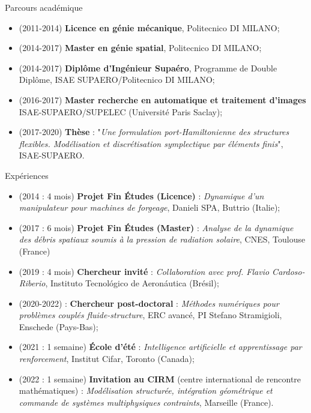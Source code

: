 \documentclass[aspectratio=169, french]{beamer}
\begin{document}
\begin{frame}{Parcours académique}
\begin{itemize}
	\item (2011-2014) \textbf{Licence en génie mécanique}, Politecnico DI MILANO;
	\item (2014-2017) \textbf{Master en génie spatial}, Politecnico DI MILANO;
	\item (2014-2017) \textbf{Diplôme d’Ingénieur Supaéro}, Programme de
	Double Diplôme, ISAE SUPAERO/Politecnico DI MILANO;
	\item (2016-2017) \textbf{Master recherche en automatique et traitement d’images
	} ISAE-SUPAERO/SUPELEC (Université Paris Saclay);
	\item (2017-2020) \textbf{Thèse} : "\textit{Une formulation port-Hamiltonienne des structures flexibles. Modélisation et discrétisation symplectique par éléments finis}", ISAE-SUPAERO.
\end{itemize}
\end{frame}

\begin{frame}{Expériences}
\begin{itemize}
\item (2014 : 4 mois) \textbf{Projet Fin Études (Licence)} : \textit{Dynamique d’un manipulateur pour machines de forgeage}, Danieli SPA, Buttrio (Italie);
\item (2017 : 6 mois) \textbf{Projet Fin Études (Master)} : \textit{Analyse de la dynamique des débris spatiaux soumis à la pression de radiation solaire}, CNES, Toulouse (France)
\item (2019 : 4 mois) \textbf{Chercheur invité} : \textit{Collaboration avec prof. Flavio Cardoso-Riberio}, Instituto Tecnológico de Aeronáutica (Brésil);
\item (2020-2022) : \textbf{Chercheur post-doctoral} : \textit{Méthodes numériques pour problèmes couplés fluide-structure}, ERC avancé, PI Stefano Stramigioli, Enschede (Pays-Bas);
\item (2021 : 1 semaine) \textbf{École d'été} : \textit{Intelligence artificielle et apprentissage par renforcement}, Institut Cifar, Toronto (Canada);
\item (2022 : 1 semaine) \textbf{Invitation au CIRM} (centre international de rencontre mathématiques) : \textit{Modélisation structurée, intégration géométrique et commande de systèmes multiphysiques contraints}, Marseille (France).
\end{itemize}
  
\end{frame}
\end{document}
